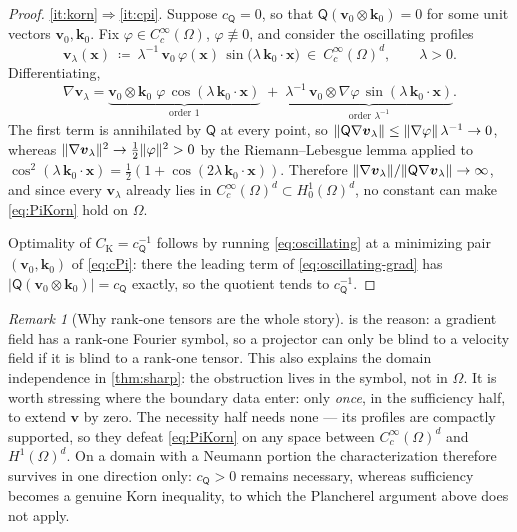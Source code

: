 \documentclass[11pt]{article}
\theoremstyle{plain}
\theoremstyle{definition}
\theoremstyle{remark}
\newtheorem{remark}[theorem]{Remark}
\newcommand{\AnyProj}{\mathsf{Q}}
\newcommand{\bv}{\boldsymbol{v}}
\newcommand{\bk}{\boldsymbol{k}}
\newcommand{\bx}{\boldsymbol{x}}
\newcommand{\CK}{C_{\mathrm{K}}}
\newcommand{\cP}{c_{\AnyProj}}
\DeclarePairedDelimiter{\norm}{\lVert}{\rVert}
\begin{document}
\begin{proof}
\ref{it:korn}$\Rightarrow$\ref{it:cpi}. Suppose $\cP=0$, so that
$\AnyProj(\bv_0\otimes\bk_0)=0$ for some unit vectors $\bv_0,\bk_0$. Fix
$\varphi\in C_c^\infty(\Omega)$, $\varphi\not\equiv0$, and consider the oscillating profiles
\begin{equation}\label{eq:oscillating}
  \bv_\lambda(\bx)\ \coloneqq\ \lambda^{-1}\,\bv_0\,\varphi(\bx)\,
  \sin\bigl(\lambda\,\bk_0\!\cdot\!\bx\bigr)\ \in\ C_c^\infty(\Omega)^d ,
  \qquad \lambda>0 .
\end{equation}
Differentiating,
\begin{equation}\label{eq:oscillating-grad}
  \nabla\bv_\lambda
  = \underbrace{\bv_0\otimes\bk_0\;\varphi\,\cos(\lambda\,\bk_0\!\cdot\!\bx)}_{\text{order }1}
  \; + \; \underbrace{\lambda^{-1}\,\bv_0\otimes\nabla\varphi\,
    \sin(\lambda\,\bk_0\!\cdot\!\bx)}_{\text{order }\lambda^{-1}} .
\end{equation}
The first term is annihilated by $\AnyProj$ at every point, so
$\norm{\AnyProj\nabla\bv_\lambda}\le\norm{\nabla\varphi}\,\lambda^{-1}\to0$, whereas
$\norm{\nabla\bv_\lambda}^2\to\tfrac12\norm{\varphi}^2>0$ by the Riemann--Lebesgue lemma
applied to $\cos^2(\lambda\,\bk_0\!\cdot\!\bx)=\tfrac12(1+\cos(2\lambda\,\bk_0\!\cdot\!\bx))$.
Therefore $\norm{\nabla\bv_\lambda}/\norm{\AnyProj\nabla\bv_\lambda}\to\infty$, and since every
$\bv_\lambda$ already lies in $C_c^\infty(\Omega)^d\subset H^1_0(\Omega)^d$, no constant can
make \cref{eq:PiKorn} hold on $\Omega$.

Optimality of $\CK=\cP^{-1}$ follows by running \cref{eq:oscillating} at a minimizing pair
$(\bv_0,\bk_0)$ of \cref{eq:cPi}: there the leading term of \cref{eq:oscillating-grad} has
$|\AnyProj(\bv_0\otimes\bk_0)|=\cP$ exactly, so the quotient tends to $\cP^{-1}$.
\end{proof}

\begin{remark}[Why rank{-}one tensors are the whole story]\label{rem:whyrankone}
 is the reason: a gradient field has a rank{-}one Fourier symbol, so a
projector can only be blind to a velocity field if it is blind to a rank{-}one tensor. This
also explains the domain independence in \cref{thm:sharp}: the obstruction lives in the symbol,
not in $\Omega$. It is worth stressing where the boundary data enter: only \emph{once}, in the sufficiency
half, to extend $\bv$ by zero. The necessity half needs none --- its profiles are compactly
supported, so they defeat \cref{eq:PiKorn} on any space between $C_c^\infty(\Omega)^d$ and
$H^1(\Omega)^d$. On a domain with a Neumann portion the characterization therefore survives
in one direction only: $\cP>0$ remains necessary, whereas sufficiency becomes a genuine Korn
inequality, to which the Plancherel argument above does not apply.
\end{remark}
\end{document}
